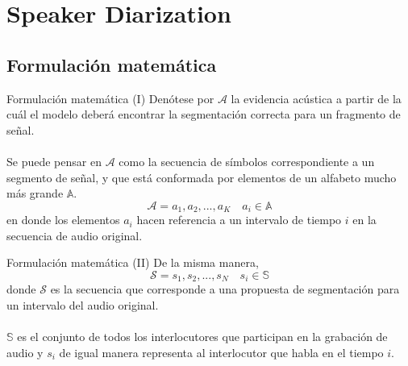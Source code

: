
\section{Speaker Diarization}

\subsection{Formulación matemática}
\begin{frame}{Formulación matemática (I)}
  Denótese por $\mathcal{A}$ la \alert{evidencia acústica} a partir de la cuál el modelo deberá encontrar la segmentación correcta para un fragmento de señal.
  \\~\\
  Se puede pensar en $\mathcal{A}$ como la secuencia de símbolos correspondiente a un segmento de señal, y que está conformada por elementos de un alfabeto mucho más grande $\mathbb{A}$. 
  \begin{equation}
  \mathcal{A} = a_1, a_2, ..., a_K \quad a_i \in \mathbb{A}
  \label{eqn:2a-1}
  \end{equation}
  en donde los elementos $a_i$ hacen referencia a un intervalo de tiempo $i$ en la secuencia de audio original.
\end{frame}

\begin{frame}{Formulación matemática (II)}
  De la misma manera,
  \begin{equation}
  \mathcal{S} = s_1, s_2, ..., s_N \quad s_i \in \mathbb{S}
  \label{eqn:2a-2}
  \end{equation}
  donde $\mathcal{S}$ es la secuencia que corresponde a una \alert{propuesta de segmentación} para un intervalo del audio original. 
  \\~\\
  $\mathbb{S}$ es el conjunto de todos los interlocutores que participan en la grabación de audio y $s_i$ de igual manera representa al interlocutor que habla en el tiempo $i$.
\end{frame}

